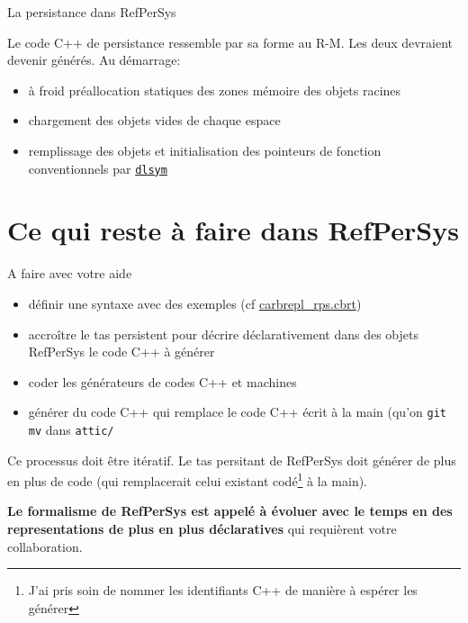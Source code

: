 \documentclass[final,a4,xcolor={svgnames,dvipsnames}]{beamer}
\begin{document}
 \begin{frame}{La persistance dans RefPerSys}

   Le code C++ de persistance ressemble par sa forme au R-M. Les deux devraient devenir générés.
   Au démarrage:
   \begin{itemize}
   \item à froid préallocation statiques des zones mémoire des objets
     racines
   \item chargement des objets vides de chaque espace
     \item remplissage des objets et initialisation des pointeurs de fonction conventionnels par 
         \href{https://man7.org/linux/man-pages/man3/dlsym.3.html}{\texttt{dlsym}}
   \end{itemize}
 \end{frame}
 
 \section{Ce qui reste à faire dans RefPerSys}
 \label{sec:refpersys-a-faire}
 \begin{frame}{A faire avec votre aide}
   \begin{itemize}
   \item définir une syntaxe avec des exemples (cf \href{https://github.com/RefPerSys/RefPerSys/blob/master/carbrepl_rps.cbrt}{carbrepl\_rps.cbrt})
   \item accroître le tas persistent pour décrire déclarativement dans
     des objets RefPerSys le code C++ à générer
   \item coder les générateurs de codes C++ et machines
     \item générer du code C++ qui remplace le code C++ écrit à la
       main (qu'on \texttt{git mv} dans \texttt{attic/}
   \end{itemize}

   Ce processus doit être itératif. Le tas persitant de RefPerSys doit
   générer de plus en plus de code (qui remplacerait celui existant
   codé\footnote{J'ai pris soin de nommer les identifiants C++ de
   manière à espérer les générer} à la main).

   \textbf{Le formalisme de RefPerSys est appelé à évoluer avec le
     temps en des representations de plus en plus déclaratives} qui
   requièrent votre collaboration.
 \end{frame}
\end{document}
